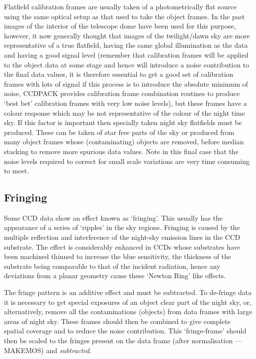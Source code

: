 \documentclass[twoside,11pt]{article}
\newcommand{\htmlref}[2]{#1}
\newcommand{\xlabel}[1]{}
\renewcommand{\_}{\texttt{\symbol{95}}}
\newcommand{\xroutine}[1]{\htmlref{{\sc #1}}{#1}}
\begin{document}
Flatfield calibration frames are usually taken of a photometrically flat
source using the same optical setup as that used to take the object
frames. In the past images of the interior of the telescope dome have
been used for this purpose, however, it now generally thought that
images of the twilight/dawn sky are more representative of a true
flatfield, having the same global illumination as the data and having a
good signal level (remember that calibration frames will be applied to
the object data at some stage and hence will introduce a noise
contribution to the final data values, it is therefore essential to get
a good set of calibration frames with lots of signal if this process is
to introduce the absolute minimum of noise, CCDPACK provides calibration
frame combination routines to produce `best bet' calibration frames with
very low noise levels), but these frames have a colour response which
may be not representative of the colour of the night time sky. If this
factor is important then specially taken night sky flatfields must be
produced. These can be taken of star free parts of the sky or produced
from many object frames whose (contaminating) objects are removed,
before median stacking to remove more spurious data values. Note in this
final case that the noise levels required to correct for small scale
variations are very time consuming to meet.

\subsection{Fringing\xlabel{CCDglosfringing}}
Some CCD data show an effect known as `fringing'. This usually has the
appearance of a series of `ripples' in the sky regions. Fringing is
caused by the multiple reflection and interference of the night-sky
emission lines in the CCD substrate. The effect is considerably enhanced
in CCDs whose substrates have been machined thinned to increase the blue
sensitivity, the thickness of the substrate being comparable to that of
the incident radiation, hence any deviations from a planar geometry
cause these `Newton Ring' like effects.

The fringe pattern is an additive effect and must be subtracted. To
de-fringe data it is necessary to get special exposures of an object
clear part of the night sky, or, alternatively, remove all the
contaminations (objects) from data frames with large areas of night sky.
These frames should then be combined to give complete spatial coverage
and to reduce the noise contribution. This `fringe-frame' should then be
scaled to the fringes present on the data frame (after normalisation
--- \xroutine{MAKEMOS}) and {\em subtracted}.
\end{document}
